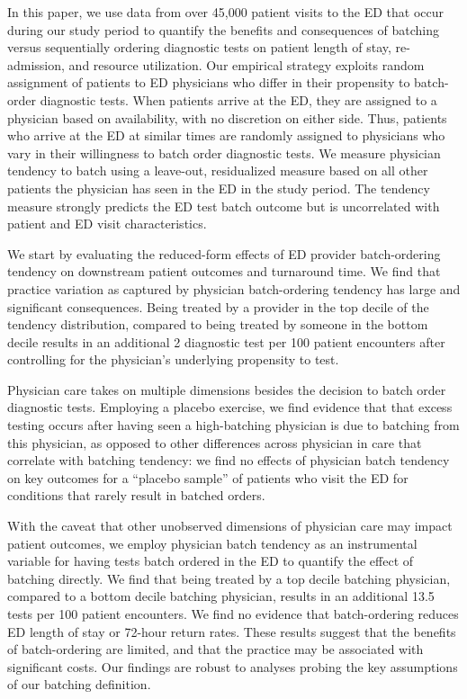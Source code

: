 \documentclass[,,nonblindrev]{informs}
\begin{document}
In this paper, we use data from over 45,000 patient visits to the ED
that occur during our study period to quantify the benefits and
consequences of batching versus sequentially ordering diagnostic tests
on patient length of stay, re-admission, and resource utilization. Our
empirical strategy exploits random assignment of patients to ED
physicians who differ in their propensity to batch-order diagnostic
tests. When patients arrive at the ED, they are assigned to a physician
based on availability, with no discretion on either side. Thus, patients
who arrive at the ED at similar times are randomly assigned to
physicians who vary in their willingness to batch order diagnostic
tests. We measure physician tendency to batch using a leave-out,
residualized measure based on all other patients the physician has seen
in the ED in the study period. The tendency measure strongly predicts
the ED test batch outcome but is uncorrelated with patient and ED visit
characteristics.

We start by evaluating the reduced-form effects of ED provider
batch-ordering tendency on downstream patient outcomes and turnaround
time. We find that practice variation as captured by physician
batch-ordering tendency has large and significant consequences. Being
treated by a provider in the top decile of the tendency distribution,
compared to being treated by someone in the bottom decile results in an
additional 2 diagnostic test per 100 patient encounters after
controlling for the physician's underlying propensity to test.

Physician care takes on multiple dimensions besides the decision to
batch order diagnostic tests. Employing a placebo exercise, we find
evidence that that excess testing occurs after having seen a
high-batching physician is due to batching from this physician, as
opposed to other differences across physician in care that correlate
with batching tendency: we find no effects of physician batch tendency
on key outcomes for a ``placebo sample'' of patients who visit the ED
for conditions that rarely result in batched orders.

With the caveat that other unobserved dimensions of physician care may
impact patient outcomes, we employ physician batch tendency as an
instrumental variable for having tests batch ordered in the ED to
quantify the effect of batching directly. We find that being treated by
a top decile batching physician, compared to a bottom decile batching
physician, results in an additional 13.5 tests per 100 patient
encounters. We find no evidence that batch-ordering reduces ED length of
stay or 72-hour return rates. These results suggest that the benefits of
batch-ordering are limited, and that the practice may be associated with
significant costs. Our findings are robust to analyses probing the key
assumptions of our batching definition.
\end{document}
